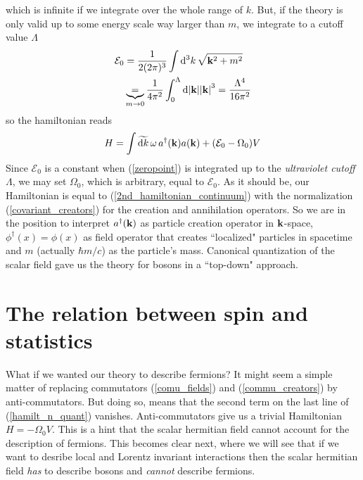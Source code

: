 which is infinite if we integrate over the whole range of $k$. But, if the theory is only valid up to some energy scale way larger than $m$, we integrate to a cutoff value $\Lambda$
\begin{equation}\begin{aligned}
    \mathcal{E}_0&=\frac{1}{2(2\pi)^3}\int\dd^3 k\,\sqrt{\vb{k}^2+m^2}\\
    &\underbrace{=}_{m\to0}\frac{1}{4\pi^2}\int_0^\Lambda \dd \abs{\vb{k}}\abs{\vb{k}}^3=\frac{\Lambda^4}{16\pi^2}
    \end{aligned}
\end{equation}
so the hamiltonian reads
\begin{equation}
    H=\int\widetilde{\dd k}\, \omega\,  a^{\dagger}(\vb{k})a(\vb{k})+(\mathcal{E}_0-\Omega_0)V
\end{equation}
Since $\mathcal{E}_0$ is a constant when (\ref{zeropoint}) is  integrated up to the \textit{ultraviolet cutoff} $\Lambda$, we may set $\Omega_0$, which is arbitrary, equal to $\mathcal{E}_0$. As it should be, our Hamiltonian is equal to (\ref{2nd_hamiltonian_continuum}) with the normalization (\ref{covariant_creators}) for the creation and annihilation operators. So we are in the position to interpret $a^\dagger(\vb{k})$ as particle creation operator in $\vb{k}$-space, $\phi^\dagger(x)=\phi(x)$ as field operator that creates ``localized" particles in spacetime and $m$ (actually $\hbar m/c$) as the particle's mass. Canonical quantization of the scalar field gave us the theory for bosons in a ``top-down" approach.
\section{The relation between spin and statistics}
What if we wanted our theory to describe fermions? It might seem a simple matter of replacing commutators (\ref{comu_fields}) and (\ref{commu_creators}) by anti-commutators. But doing so, means that the second term on the last line of (\ref{hamilt_n_quant}) vanishes. Anti-commutators give us a trivial  Hamiltonian $H=-\Omega_0V$. This is a hint that the scalar hermitian field cannot account for the description of fermions.
This becomes clear next, where we will see that if we want to desribe local and Lorentz invariant interactions then the scalar hermitian field \textit{has} to describe bosons and \textit{cannot} describe fermions. \\

